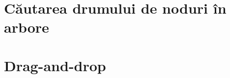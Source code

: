 \documentclass[a4paper,12pt]{report}
\begin{document}
\section{Căutarea drumului de noduri în arbore}\label{appendix:node_path_search_impl}%

\section{Drag-and-drop}\label{appendix:drag_and_drop}%







\end{document}
